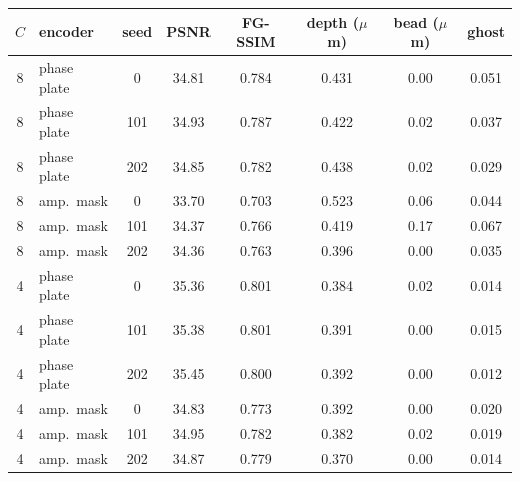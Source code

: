 \begin{tabular}{@{}cl c ccc cc@{}}\toprule
$C$ & encoder & seed & PSNR & FG-SSIM & depth ($\mu$m) & bead ($\mu$m) & ghost\\\midrule
8 & phase plate & 0 & 34.81 & 0.784 & 0.431 & 0.00 & 0.051\\
8 & phase plate & 101 & 34.93 & 0.787 & 0.422 & 0.02 & 0.037\\
8 & phase plate & 202 & 34.85 & 0.782 & 0.438 & 0.02 & 0.029\\
8 & amp.\ mask & 0 & 33.70 & 0.703 & 0.523 & 0.06 & 0.044\\
8 & amp.\ mask & 101 & 34.37 & 0.766 & 0.419 & 0.17 & 0.067\\
8 & amp.\ mask & 202 & 34.36 & 0.763 & 0.396 & 0.00 & 0.035\\
4 & phase plate & 0 & 35.36 & 0.801 & 0.384 & 0.02 & 0.014\\
4 & phase plate & 101 & 35.38 & 0.801 & 0.391 & 0.00 & 0.015\\
4 & phase plate & 202 & 35.45 & 0.800 & 0.392 & 0.00 & 0.012\\
4 & amp.\ mask & 0 & 34.83 & 0.773 & 0.392 & 0.00 & 0.020\\
4 & amp.\ mask & 101 & 34.95 & 0.782 & 0.382 & 0.02 & 0.019\\
4 & amp.\ mask & 202 & 34.87 & 0.779 & 0.370 & 0.00 & 0.014\\
\bottomrule\end{tabular}
